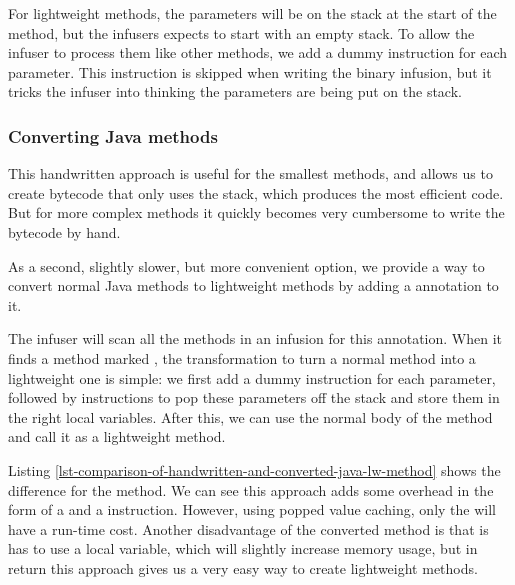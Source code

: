 For lightweight methods, the parameters will be on the stack at the start of the method, but the infusers expects to start with an empty stack. To allow the infuser to process them like other methods, we add a dummy  instruction for each parameter. This instruction is skipped when writing the binary infusion, but it tricks the infuser into thinking the parameters are being put on the stack.

\subsubsection{Converting Java methods}
This handwritten approach is useful for the smallest methods, and allows us to create bytecode that only uses the stack, which produces the most efficient code. But for more complex methods it quickly becomes very cumbersome to write the bytecode by hand.

As a second, slightly slower, but more convenient option, we provide a way to convert normal Java methods to lightweight methods by adding a  annotation to it.

The infuser will scan all the methods in an infusion for this annotation. When it finds a method marked , the transformation to turn a normal method into a lightweight one is simple: we first add a dummy  instruction for each parameter, followed by  instructions to pop these parameters off the stack and store them in the right local variables. After this, we can use the normal body of the method and call it as a lightweight method.

Listing \ref{lst-comparison-of-handwritten-and-converted-java-lw-method} shows the difference for the  method. We can see this approach adds some overhead in the form of a  and a  instruction. However, using popped value caching, only the  will have a run-time cost. Another disadvantage of the converted method is that is has to use a local variable, which will slightly increase memory usage, but in return this approach gives us a very easy way to create lightweight methods.

